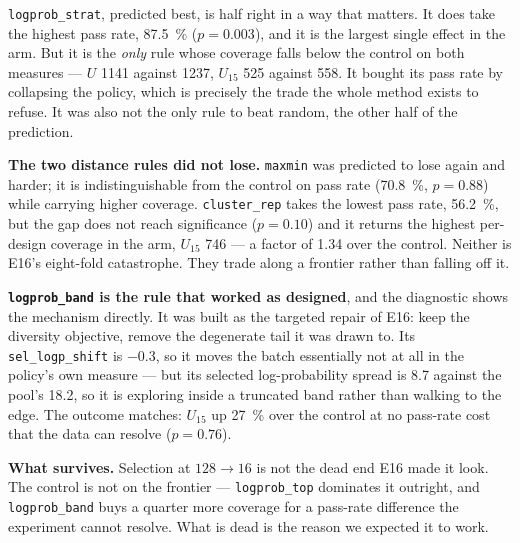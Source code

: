 \texttt{logprob\_strat}, predicted best, is half right in a way that matters.
It does take the highest pass rate, \SI{87.5}{\percent} ($p = 0.003$), and it is
the largest single effect in the arm. But it is the \emph{only} rule whose
coverage falls below the control on both measures --- $U$ 1141 against 1237,
$U_{15}$ 525 against 558. It bought its pass rate by collapsing the policy,
which is precisely the trade the whole method exists to refuse. It was also not
the only rule to beat random, the other half of the prediction.

\textbf{The two distance rules did not lose.} \texttt{maxmin} was predicted to
lose again and harder; it is indistinguishable from the control on pass rate
(\SI{70.8}{\percent}, $p = 0.88$) while carrying higher coverage.
\texttt{cluster\_rep} takes the lowest pass rate, \SI{56.2}{\percent}, but the
gap does not reach significance ($p = 0.10$) and it returns the highest per-design
coverage in the arm, $U_{15}$ 746 --- a factor of \num{1.34} over the control.
Neither is E16's eight-fold catastrophe. They trade along a frontier rather than
falling off it.

\textbf{\texttt{logprob\_band} is the rule that worked as designed}, and the
diagnostic shows the mechanism directly. It was built as the targeted repair of
E16: keep the diversity objective, remove the degenerate tail it was drawn to.
Its \texttt{sel\_logp\_shift} is \num{-0.3}, so it moves the batch essentially
not at all in the policy's own measure --- but its selected log-probability
spread is \num{8.7} against the pool's \num{18.2}, so it is exploring inside a
truncated band rather than walking to the edge. The outcome matches: $U_{15}$ up
\SI{27}{\percent} over the control at no pass-rate cost that the data can resolve
($p = 0.76$).

\textbf{What survives.} Selection at $128 \to 16$ is not the dead end E16 made it
look. The control is not on the frontier --- \texttt{logprob\_top} dominates it
outright, and \texttt{logprob\_band} buys a quarter more coverage for a pass-rate
difference the experiment cannot resolve. What is dead is the reason we expected
it to work.

